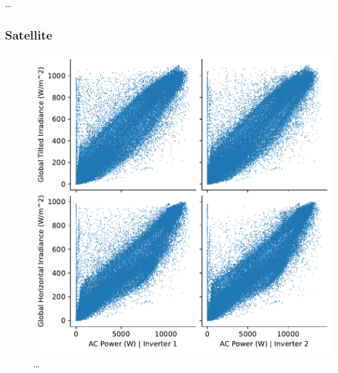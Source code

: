 
\dots

\subsubsection{Satellite}

\begin{figure}[h!]
    \centering
    \includegraphics[width=\textwidth]{figures/chapter5/analysis/08_power_irrad_pairplot_scatter_kb.pdf}
    \caption{\dots}
    \label{fig:eda_power_irrad_pair_kb}
\end{figure}

